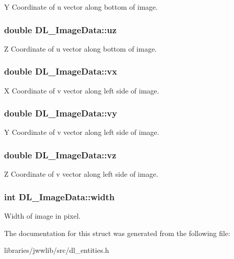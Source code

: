Y Coordinate of u vector along bottom of image. \hypertarget{structDL__ImageData_a5f83122bf953cae7d96871847b59268d}{
\subsubsection[{uz}]{\setlength{\rightskip}{0pt plus 5cm}double D\-L\-\_\-\-Image\-Data\-::uz}}\label{structDL__ImageData_a5f83122bf953cae7d96871847b59268d}
Z Coordinate of u vector along bottom of image. \hypertarget{structDL__ImageData_afa9d87c2584ab8f8e7010579d302a7aa}{
\subsubsection[{vx}]{\setlength{\rightskip}{0pt plus 5cm}double D\-L\-\_\-\-Image\-Data\-::vx}}\label{structDL__ImageData_afa9d87c2584ab8f8e7010579d302a7aa}
X Coordinate of v vector along left side of image. \hypertarget{structDL__ImageData_acdc17067ae709f2c21ca772e592acc14}{
\subsubsection[{vy}]{\setlength{\rightskip}{0pt plus 5cm}double D\-L\-\_\-\-Image\-Data\-::vy}}\label{structDL__ImageData_acdc17067ae709f2c21ca772e592acc14}
Y Coordinate of v vector along left side of image. \hypertarget{structDL__ImageData_aa2f02fb820c34ab50f33913770bb1697}{
\subsubsection[{vz}]{\setlength{\rightskip}{0pt plus 5cm}double D\-L\-\_\-\-Image\-Data\-::vz}}\label{structDL__ImageData_aa2f02fb820c34ab50f33913770bb1697}
Z Coordinate of v vector along left side of image. \hypertarget{structDL__ImageData_af9c24b61881540aeb90e01104cb019f8}{
\subsubsection[{width}]{\setlength{\rightskip}{0pt plus 5cm}int D\-L\-\_\-\-Image\-Data\-::width}}\label{structDL__ImageData_af9c24b61881540aeb90e01104cb019f8}
Width of image in pixel. 

The documentation for this struct was generated from the following file\-:\begin{DoxyCompactItemize}
\item 
libraries/jwwlib/src/dl\-\_\-entities.\-h\end{DoxyCompactItemize}
